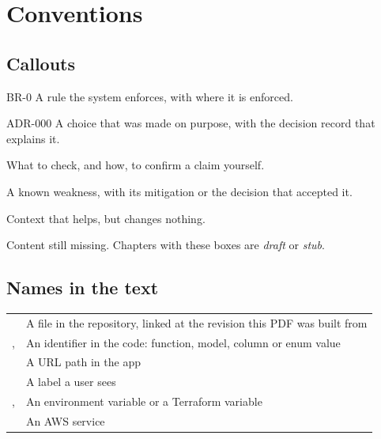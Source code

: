 \section{Conventions}
\subsection{Callouts}
\begin{brule}{BR-0}
  A rule the system enforces, with where it is enforced.
\end{brule}
\begin{decision}{ADR-000}
  A choice that was made on purpose, with the decision record that explains it.
\end{decision}
\begin{auditnote}
  What to check, and how, to confirm a claim yourself.
\end{auditnote}
\begin{risk}
  A known weakness, with its mitigation or the decision that accepted it.
\end{risk}
\begin{note}
  Context that helps, but changes nothing.
\end{note}
\begin{todo}
  Content still missing. Chapters with these boxes are \emph{draft} or \emph{stub}.
\end{todo}

\subsection{Names in the text}
\begin{xltabular}{\linewidth}{@{}l L@{}}
  \toprule
   & \\
  \midrule
   & A file in the repository, linked at the revision this PDF was built from\\
  ,  & An identifier in the code: function, model, column or enum value\\
   & A URL path in the app\\
   & A label a user sees\\
  ,  & An environment variable or a Terraform variable\\
   & An AWS service\\
  \bottomrule
\end{xltabular}

